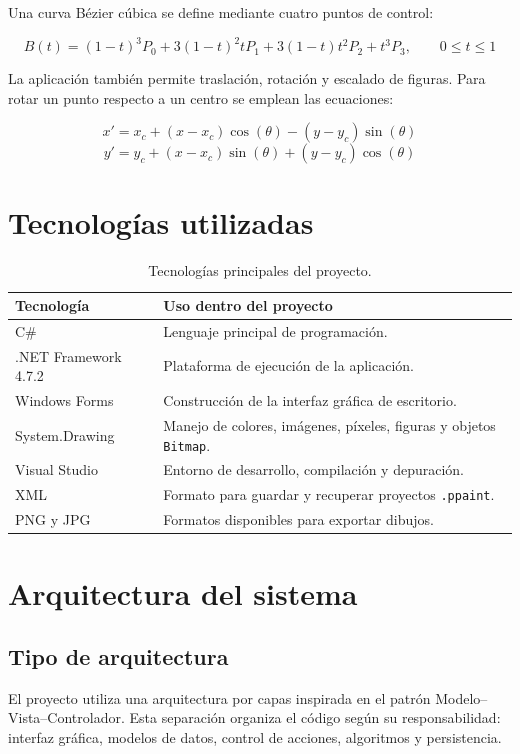 \documentclass[11pt,a4paper]{report}
\begin{document}
Una curva Bézier cúbica se define mediante cuatro puntos de control:

\[
B(t)=(1-t)^3P_0+3(1-t)^2tP_1+3(1-t)t^2P_2+t^3P_3, \qquad 0 \leq t \leq 1
\]

La aplicación también permite traslación, rotación y escalado de figuras. Para rotar un punto respecto a un centro se emplean las ecuaciones:

\[
x' = x_c + (x-x_c)\cos(\theta) - (y-y_c)\sin(\theta)
\]
\[
y' = y_c + (x-x_c)\sin(\theta) + (y-y_c)\cos(\theta)
\]

\chapter{Tecnologías utilizadas}

\begin{table}[H]
\centering
\caption{Tecnologías principales del proyecto.}
\begin{tabular}{p{4cm} p{9cm}}
\toprule
\textbf{Tecnología} & \textbf{Uso dentro del proyecto} \\
\midrule
C\# & Lenguaje principal de programación. \\
.NET Framework 4.7.2 & Plataforma de ejecución de la aplicación. \\
Windows Forms & Construcción de la interfaz gráfica de escritorio. \\
System.Drawing & Manejo de colores, imágenes, píxeles, figuras y objetos \texttt{Bitmap}. \\
Visual Studio & Entorno de desarrollo, compilación y depuración. \\
XML & Formato para guardar y recuperar proyectos \texttt{.ppaint}. \\
PNG y JPG & Formatos disponibles para exportar dibujos. \\
\bottomrule
\end{tabular}
\end{table}

\chapter{Arquitectura del sistema}

\section{Tipo de arquitectura}

El proyecto utiliza una arquitectura por capas inspirada en el patrón Modelo--Vista--Controlador. Esta separación organiza el código según su responsabilidad: interfaz gráfica, modelos de datos, control de acciones, algoritmos y persistencia.
\end{document}
